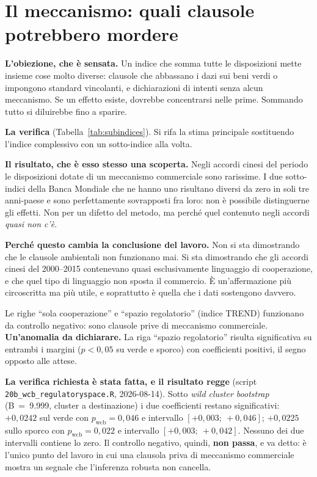 \documentclass[11pt,a4paper]{article}
\begin{document}


\clearpage
\section{Il meccanismo: quali clausole potrebbero mordere}

\textbf{L'obiezione, che \`e sensata.} Un indice che somma tutte le disposizioni mette
insieme cose molto diverse: clausole che abbassano i dazi sui beni verdi o impongono
standard vincolanti, e dichiarazioni di intenti senza alcun meccanismo. Se un effetto
esiste, dovrebbe concentrarsi nelle prime. Sommando tutto si diluirebbe fino a sparire.

\textbf{La verifica} (Tabella~\ref{tab:subindices}). Si rifa la stima principale sostituendo
l'indice complessivo con un sotto-indice alla volta.

\textbf{Il risultato, che \`e esso stesso una scoperta.} Negli accordi cinesi del periodo le
disposizioni dotate di un meccanismo commerciale sono rarissime. I due sotto-indici della
Banca Mondiale che ne hanno uno risultano diversi da zero in soli tre anni-paese e sono
perfettamente sovrapposti fra loro: non \`e possibile distinguerne gli effetti. Non per un
difetto del metodo, ma perch\'e quel contenuto negli accordi \emph{quasi non c'\`e}.

\textbf{Perch\'e questo cambia la conclusione del lavoro.} Non si sta dimostrando che le
clausole ambientali non funzionano mai. Si sta dimostrando che gli accordi cinesi del
2000--2015 contenevano quasi esclusivamente linguaggio di cooperazione, e che quel tipo di
linguaggio non sposta il commercio. \`E un'affermazione pi\`u circoscritta ma pi\`u utile,
e soprattutto \`e quella che i dati sostengono davvero.

Le righe ``sola cooperazione'' e ``spazio regolatorio'' (indice TREND) funzionano da
controllo negativo: sono clausole prive di meccanismo commerciale. \textbf{Un'anomalia da
dichiarare.} La riga ``spazio regolatorio'' risulta significativa su entrambi i margini
($p < 0{,}05$ su verde e sporco) con coefficienti positivi, il segno opposto alle attese.

\textbf{La verifica richiesta \`e stata fatta, e il risultato regge} (script
\texttt{20b\_wcb\_regulatoryspace.R}, 2026-08-14). Sotto \emph{wild cluster bootstrap}
(B~=~9.999, cluster a destinazione) i due coefficienti restano significativi:
$+0{,}0242$ sul verde con $p_{\mathrm{wcb}} = 0{,}046$ e intervallo $[+0{,}003;\ +0{,}046]$;
$+0{,}0225$ sullo sporco con $p_{\mathrm{wcb}} = 0{,}022$ e intervallo
$[+0{,}003;\ +0{,}042]$. Nessuno dei due intervalli contiene lo zero. Il controllo negativo,
quindi, \textbf{non passa}, e va detto: \`e l'unico punto del lavoro in cui una clausola
priva di meccanismo commerciale mostra un segnale che l'inferenza robusta non cancella.
\end{document}
